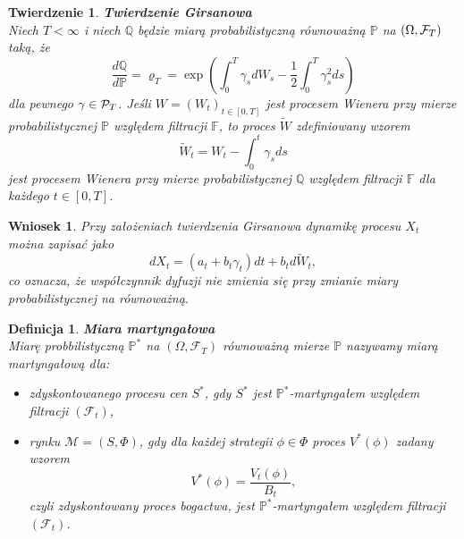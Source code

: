 \documentclass{mini}
\theoremstyle{mythstyle}
\newtheorem{Twierdzenie}{Twierdzenie}[chapter]
\newtheorem{Definicja}{Definicja}[chapter]
\newtheorem{Wniosek}{Wniosek}[chapter]
\begin{document}
\begin{Twierdzenie}\textbf{Twierdzenie Girsanowa}\\
	Niech $T < \infty$ i niech $\mathbb{Q}$ będzie miarą
	probabilistyczną równoważną $\mathbb{P}$ na $(\Omega, {\cal F}_T)$ taką, że
	\begin{equation}
	\frac{d \mathbb{Q}}{d \mathbb{P}} = \varrho_T = \exp\left(\int_0^T \gamma_s d
	W_s - \frac{1}{2} \int_0^T \gamma_s^2 ds\right)
	\end{equation}
	dla pewnego $\gamma \in {\cal P}_T$. Jeśli $W = (W_t)_{t \in [0, T]}$ jest procesem Wienera przy mierze probabilistycznej $\mathbb{P}$ względem filtracji $\mathbb{F}$, to proces $\widetilde{W}$ zdefiniowany wzorem
	\[
	\widetilde{W}_t = W_t - \int_0^t \gamma_s ds
	\]
	jest procesem Wienera przy mierze probabilistycznej $\mathbb{Q}$ względem filtracji $\mathbb{F}$ dla każdego ${t \in [0,T]}$.\\
	
\end{Twierdzenie}

\begin{Wniosek}
	Przy założeniach twierdzenia Girsanowa dynamikę procesu $X_t$ można zapisać jako
	$$ dX_t = (a_t+b_t \gamma_t)dt + b_t d\widetilde{W}_t,$$
	co oznacza, że współczynnik dyfuzji nie zmienia się przy zmianie miary probabilistycznej na równoważną.\\
\end{Wniosek}
\begin{Definicja}
	\textbf{Miara martyngałowa}\\
	Miarę probbilistyczną $\mathbb{P}^*$ na $(\Omega,\mathcal{F}_T)$ równoważną mierze $\mathbb{P}$ nazywamy miarą martyngałową dla:
	\begin{itemize}
		\item zdyskontowanego procesu cen $S^*$, gdy $S^*$ jest $\mathbb{P}^*$-martyngałem względem filtracji $(\mathcal{F}_t)$,
		\item rynku $\mathcal{M}= (S,\Phi)$, gdy dla każdej strategii $\phi \in \Phi$ proces $V^*(\phi)$ zadany wzorem
		\begin{equation*}
		V^*(\phi) = \frac{V_t(\phi)}{B_t},
		\end{equation*}
		czyli zdyskontowany proces bogactwa, jest $\mathbb{P}^*$-martyngałem względem filtracji $(\mathcal{F}_t)$.\\
	\end{itemize}
\end{Definicja}
\end{document}
